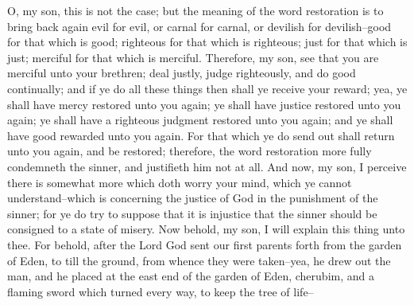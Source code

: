 O, my son, this is not the case; but the meaning of the word restoration is to bring back again evil for evil, or carnal for carnal, or devilish for devilish--good for that which is good; righteous for that which is righteous; just for that which is just; merciful for that which is merciful.
\bverse \iffalse Therefore, my son, see that you are merciful unto your brethren; deal justly, judge righteously, and do good continually; and if ye do all these things then shall ye receive your reward; yea, ye shall have mercy restored unto you again; ye shall have justice restored unto you again; ye shall have a righteous judgment restored unto you again; and ye shall have good rewarded unto you again. \fi
Therefore, my son, see that you are merciful unto your brethren; deal justly, judge righteously, and do good continually; and if ye do all these things then shall ye receive your reward; yea, ye shall have mercy restored unto you again; ye shall have justice restored unto you again; ye shall have a righteous judgment restored unto you again; and ye shall have good rewarded unto you again.
\bverse \iffalse For that which ye do send out shall return unto you again, and be restored; therefore, the word restoration more fully condemneth the sinner, and justifieth him not at all. \fi
For that which ye do send out shall return unto you again, and be restored; therefore, the word restoration more fully condemneth the sinner, and justifieth him not at all.
\bchapter
\bverse \iffalse And now, my son, I perceive there is somewhat more which doth worry your mind, which ye cannot understand--which is concerning the justice of God in the punishment of the sinner; for ye do try to suppose that it is injustice that the sinner should be consigned to a state of misery. \fi
And now, my son, I perceive there is somewhat more which doth worry your mind, which ye cannot understand--which is concerning the justice of God in the punishment of the sinner; for ye do try to suppose that it is injustice that the sinner should be consigned to a state of misery.
\bverse \iffalse Now behold, my son, I will explain this thing unto thee. For behold, after the Lord God sent our first parents forth from the garden of Eden, to till the ground, from whence they were taken--yea, he drew out the man, and he placed at the east end of the garden of Eden, cherubim, and a flaming sword which turned every way, to keep the tree of life-- \fi
Now behold, my son, I will explain this thing unto thee. For behold, after the Lord God sent our first parents forth from the garden of Eden, to till the ground, from whence they were taken--yea, he drew out the man, and he placed at the east end of the garden of Eden, cherubim, and a flaming sword which turned every way, to keep the tree of life--
